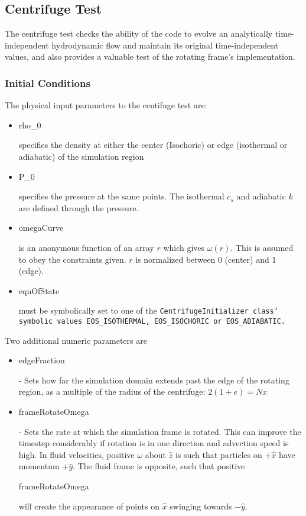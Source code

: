 

\subsection{Centrifuge Test}

The centrifuge test checks the ability of the code to evolve an analytically time-independent
hydrodynamic flow and maintain its original time-independent values, and also provides a
valuable test of the rotating frame's implementation.

\subsubsection{Initial Conditions}

The physical input parameters to the centifuge test are:
\begin{itemize}
\item \begin{tt}rho\_0\end{tt} specifies the density at either the center (Isochoric) or edge (isothermal
or adiabatic) of the simulation region
\item \begin{tt}P\_0\end{tt} specifies the pressure at the same points. The isothermal $c_s$ and adiabatic $k$
are defined through the pressure.
\item \begin{tt}omegaCurve\end{tt} is an anonymous function of an array $r$ which gives $\omega(r)$. This is 
assumed to obey the constraints given. $r$ is normalized between 0 (center) and 1 (edge).
\item \begin{tt}eqnOfState\end{tt} must be symbolically set to one of the \tt{CentrifugeInitializer} class' 
symbolic values \tt{EOS\_ISOTHERMAL}, \tt{EOS\_ISOCHORIC} or \tt{EOS\_ADIABATIC}.
\end{itemize}

Two additional numeric parameters are
\begin{itemize}
\item \begin{tt}edgeFraction\end{tt} - Sets how far the simulation domain extends past the edge of the
rotating region, as a multiple of the radius of the centrifuge: $2(1+e) = Nx$
\item \begin{tt}frameRotateOmega\end{tt} - Sets the rate at which the simulation frame is rotated. This can improve the 
timestep considerably if rotation is in one direction and advection speed is high. In fluid velocities,
positive $\omega$ about $\hat{z}$ is such that particles on $+\hat{x}$ have momentum $+\hat{y}$. The fluid frame is opposite, such
that positive \begin{tt}frameRotateOmega\end{tt} will create the appearance of points on $\hat{x}$ swinging towards $-\hat{y}$.
\end{itemize}

